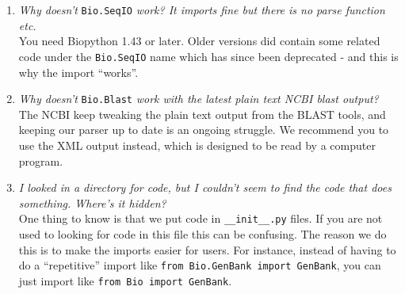 \documentclass{report}
\begin{document}
\begin{enumerate}
  \item \emph{Why doesn't} \verb|Bio.SeqIO| \emph{work? It imports fine but there is no parse function etc.} \\
  You need Biopython 1.43 or later.  Older versions did contain some related code under the \verb|Bio.SeqIO| name which has since been deprecated - and this is why the import ``works''.
  
  \item \emph{Why doesn't} \verb|Bio.Blast| \emph{work with the latest plain text NCBI blast output?} \\
  The NCBI keep tweaking the plain text output from the BLAST tools, and keeping our parser up to date is an ongoing struggle.  We recommend you to use the XML output instead, which is designed to be read by a computer program.

  \item \emph{I looked in a directory for code, but I couldn't seem to find the code that does something. Where's it hidden?} \\
  One thing to know is that we put code in \verb|__init__.py| files. If you are not used to looking for code in this file this can be confusing. The reason we do this is to make the imports easier for users. For instance, instead of having to do a ``repetitive'' import like \verb|from Bio.GenBank import GenBank|, you can just import like \verb|from Bio import GenBank|.


\end{enumerate}
\end{document}
